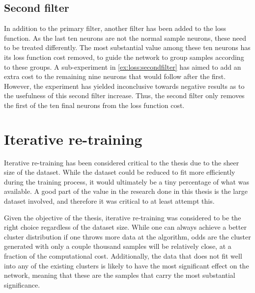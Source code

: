 \subsection{Second filter}
\label{me:secondfilter}
In addition to the primary filter, another filter has been added to the loss function.
As the last ten neurons are not the normal sample neurons, these need to be treated differently.
The most substantial value among these ten neurons has its loss function cost removed, to guide the network to group samples according to these groups.
A sub-experiment in \cref{ex:loss:secondfilter} has aimed to add an extra cost to the remaining nine neurons that would follow after the first.
However, the experiment has yielded inconclusive towards negative results as to the usefulness of this second filter increase.
Thus, the second filter only removes the first of the ten final neurons from the loss function cost.





\section{Iterative re-training}
Iterative re-training has been considered critical to the thesis due to the sheer size of the dataset.
While the dataset could be reduced to fit more efficiently during the training process, it would ultimately be a tiny percentage of what was available.
A good part of the value in the research done in this thesis is the large dataset involved, and therefore it was critical to at least attempt this.

Given the objective of the thesis, iterative re-training was considered to be the right choice regardless of the dataset size.
While one can always achieve a better cluster distribution if one throws more data at the algorithm, odds are the cluster generated with only a couple thousand samples will be relatively close, at a fraction of the computational cost.
Additionally, the data that does not fit well into any of the existing clusters is likely to have the most significant effect on the network, meaning that these are the samples that carry the most substantial significance.


